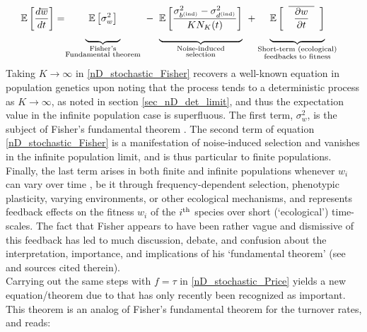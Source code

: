 \begin{align}
\label{nD_stochastic_Fisher}
\mathbb{E}\left[\frac{d\overline{w}}{dt}\right] &= 
\negmedspace {\underbrace{\mystrut{4ex} \ \vphantom{ \frac{\sigma^2_{b^{\textrm{(ind)}}} - \sigma^2_{d^{\textrm{(ind)}}}}{KN_K(t)} } \mathbb{E}\left[\sigma^2_{w}\right] \ }_{\substack{\text{Fisher's} \\ \text{Fundamental theorem}}}} \ - \ {\underbrace{\mystrut{4ex}\mathbb{E}\left[\frac{\sigma^2_{b^{\textrm{(ind)}}} - \sigma^2_{d^{\textrm{(ind)}}}}{KN_K(t)}\right]}_{\substack{\text{Noise-induced} \\ \text{selection}}}} \ + {\underbrace{\mystrut{4ex} \vphantom{ \frac{\sigma^2_{b^{\textrm{(ind)}}} - \sigma^2_{d^{\textrm{(ind)}}}}{KN_K(t)} } \mathbb{E}\left[\hphantom{a}\overline{\hphantom{a}\frac{\partial w}{\partial t}\hphantom{a}}\hphantom{a}\right]}_{\substack{\text{Short-term (ecological)} \\ \text{feedbacks to fitness}}}}
\end{align}
Taking $K \to \infty$ in \eqref{nD_stochastic_Fisher} recovers a well-known equation in population genetics upon noting that the process tends to a deterministic process as $K \to \infty$, as noted in section \ref{sec_nD_det_limit}, and thus the expectation value in the infinite population case is superfluous. The first term, $\sigma^2_w$, is the subject of Fisher's fundamental theorem \citep{fisher_genetical_1930,  price_fishers_1972, frank_fishers_1992, kokko_stagnation_2021}. The second term of equation \eqref{nD_stochastic_Fisher} is a manifestation of noise-induced selection and vanishes in the infinite population limit, and is thus particular to finite populations. Finally, the last term arises in both finite and infinite populations whenever $w_i$ can vary over time \citep{frank_fishers_1992,kokko_stagnation_2021,baez_fundamental_2021}, be it through frequency-dependent selection, phenotypic plasticity, varying environments, or other ecological mechanisms, and represents feedback effects on the fitness $w_i$ of the $i\textsuperscript{th}$ species over short (`ecological') time-scales. The fact that Fisher appears to have been rather vague and dismissive of this feedback \citep{fisher_genetical_1930} has led to much discussion, debate, and confusion about the interpretation, importance, and implications of his `fundamental theorem' (see \cite{kokko_stagnation_2021} and sources cited therein).\\
Carrying out the same steps with $f = \tau$ in \eqref{nD_stochastic_Price} yields a new equation/theorem due to \cite{kuosmanen_turnover_2022} that has only recently been recognized as important. This theorem is an analog of Fisher's fundamental theorem for the turnover rates, and reads:
